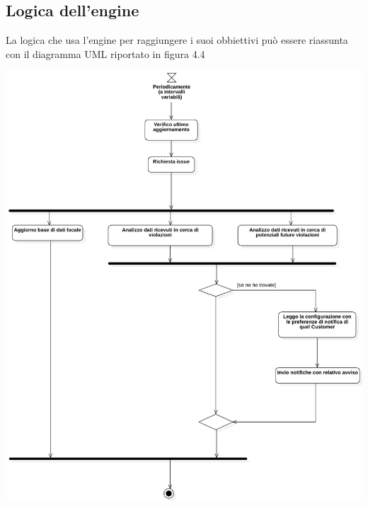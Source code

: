     \subsection{Logica dell'engine}
        La logica che usa l'engine per raggiungere i suoi obbiettivi può essere riassunta con il diagramma UML riportato in figura 4.4
        \begin{center}
            \includegraphics[keepaspectratio = true, width=15cm]{immagini/progettazione/activity.png}
        \end{center}
    
        
